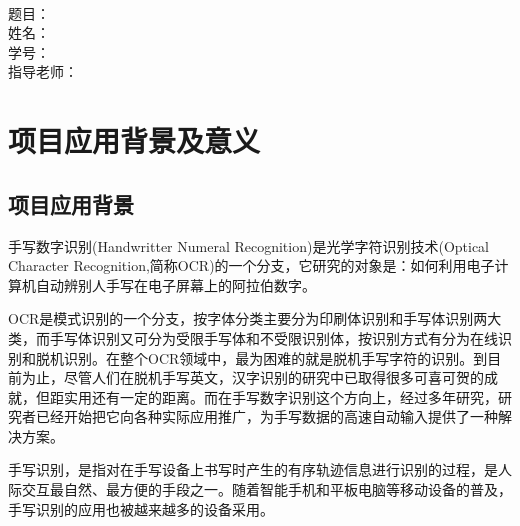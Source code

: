 \documentclass[UTF8]{ctexart}
\begin{document}
	\begin{titlepage}
		\heiti
		\vspace*{64pt}
		\begin{center}
			\\
			\vspace*{48pt}
			
			\LARGE 题目：\ \ \underline{}\\
			\vspace*{48pt}
			\Large 姓\qquad 名：\ \ \underline{}\ \ \\
			\vspace*{48pt}
			\Large 学\qquad 号：\ \ \underline{}\\
			\vspace*{48pt}
			\Large 指导老师：\ \  \underline{}\\
		\end{center}
	\end{titlepage}

	\newpage
	\fancyhf{}
	\renewcommand{\contentsname}{\LARGE 目\quad 录}
	\tableofcontents
	\newpage

\section{项目应用背景及意义}
\subsection{项目应用背景}
手写数字识别(Handwritter Numeral Recognition)是光学字符识别技术(Optical Character Recognition,简称OCR)的一个分支，它研究的对象是：如何利用电子计算机自动辨别人手写在电子屏幕上的阿拉伯数字。

OCR是模式识别的一个分支，按字体分类主要分为印刷体识别和手写体识别两大类，而手写体识别又可分为受限手写体和不受限识别体，按识别方式有分为在线识别和脱机识别。在整个OCR领域中，最为困难的就是脱机手写字符的识别。到目前为止，尽管人们在脱机手写英文，汉字识别的研究中已取得很多可喜可贺的成就，但距实用还有一定的距离。而在手写数字识别这个方向上，经过多年研究，研究者已经开始把它向各种实际应用推广，为手写数据的高速自动输入提供了一种解决方案。

手写识别，是指对在手写设备上书写时产生的有序轨迹信息进行识别的过程，是人际交互最自然、最方便的手段之一。随着智能手机和平板电脑等移动设备的普及，手写识别的应用也被越来越多的设备采用。
\end{document}
